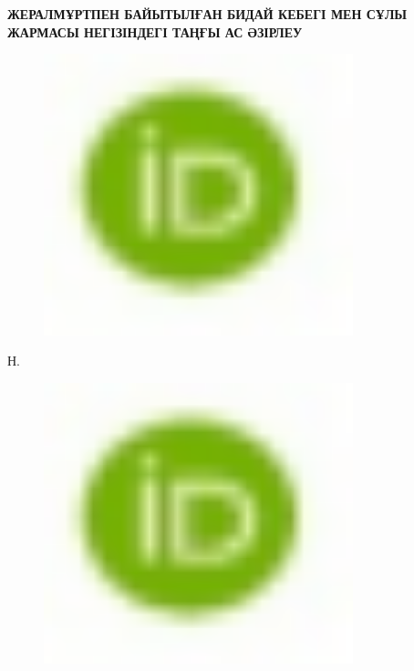 
{\bfseries ЖЕРАЛМҰРТПЕН БАЙЫТЫЛҒАН БИДАЙ КЕБЕГІ МЕН СҰЛЫ ЖАРМАСЫ
НЕГІЗІНДЕГІ ТАҢҒЫ АС ӘЗІРЛЕУ}

\begin{figure}[H]
	\centering
	\includegraphics[width=0.8\textwidth]{media/pish2/image2}
	\caption*{}
\end{figure}

Н.
\begin{figure}[H]
	\centering
	\includegraphics[width=0.8\textwidth]{media/pish2/image2}
	\caption*{}
\end{figure}

